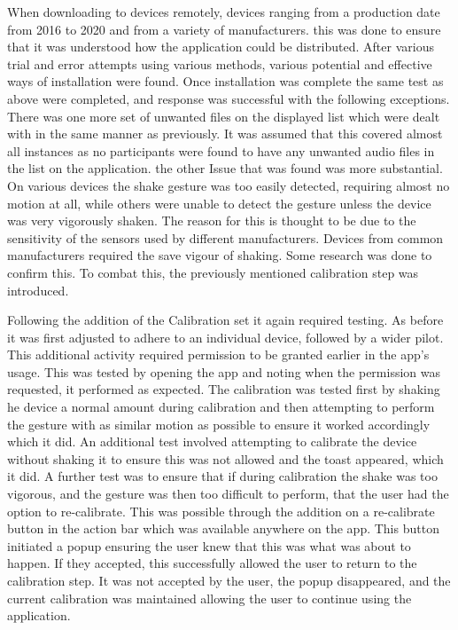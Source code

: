 \documentclass{l4proj}
\begin{document}
When downloading to devices remotely, devices ranging from a production date from 2016 to 2020 and from a variety of manufacturers. this was done to ensure that it was understood how the application could be distributed. After various trial and error attempts using various methods, various potential and effective ways of installation were found. Once installation was complete the same test as above were completed, and response was successful with the following exceptions. There was one more set of unwanted files on the displayed list which were dealt with in the same manner as previously. It was assumed that this covered almost all instances as no participants were found to have any unwanted audio files in the list on the application. the other Issue that was found was more substantial. On various devices the shake gesture was too easily detected, requiring almost no motion at all, while others were unable to detect the gesture unless the device was very vigorously shaken. The reason for this is thought to be due to the sensitivity of the sensors used by different manufacturers. Devices from common manufacturers required the save vigour of shaking. Some research was done to confirm this. To combat this, the previously mentioned calibration step was introduced.

Following the addition of the Calibration set it again required testing. As before it was first adjusted to adhere to an individual device, followed by a wider pilot. This additional activity required permission to be granted earlier in the app’s usage. This was tested by opening the app and noting when the permission was requested, it performed as expected. The calibration was tested first by shaking he device a normal amount during calibration and then attempting to perform the gesture with as similar motion as possible to ensure it worked accordingly which it did. An additional test involved attempting to calibrate the device without shaking it to ensure this was not allowed and the toast appeared, which it did. A further test was to ensure that if during calibration the shake was too vigorous, and the gesture was then too difficult to perform, that the user had the option to re-calibrate. This was possible through the addition on a re-calibrate button in the action bar which was available anywhere on the app. This button initiated a popup ensuring the user knew that this was what was about to happen. If they accepted, this successfully allowed the user to return to the calibration step. It was not accepted by the user, the popup disappeared, and the current calibration was maintained allowing the user to continue using the application.
\end{document}
